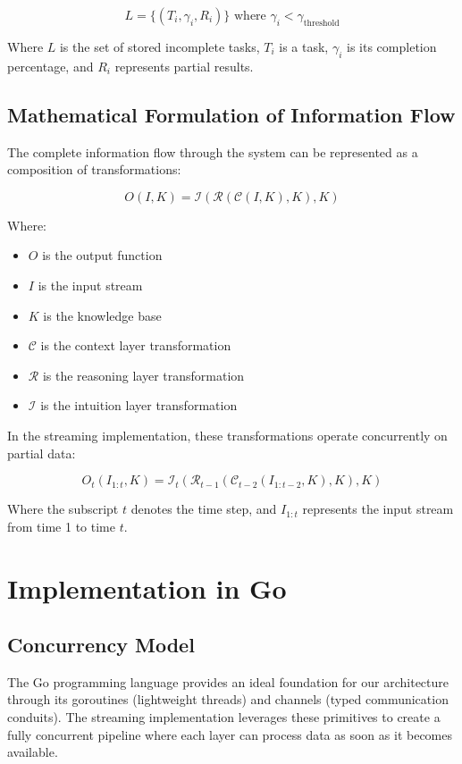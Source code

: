 \documentclass[11pt,a4paper,twocolumn]{article}
\begin{document}
\begin{equation}
L = \{(T_i, \gamma_i, R_i)\} \text{ where } \gamma_i < \gamma_{\text{threshold}}
\end{equation}

Where $L$ is the set of stored incomplete tasks, $T_i$ is a task, $\gamma_i$ is its completion percentage, and $R_i$ represents partial results.

\subsection{Mathematical Formulation of Information Flow}

The complete information flow through the system can be represented as a composition of transformations:

\begin{equation}
O(I, K) = \mathcal{I}(\mathcal{R}(\mathcal{C}(I, K), K), K)
\end{equation}

Where:
\begin{itemize}
    \item $O$ is the output function
    \item $I$ is the input stream
    \item $K$ is the knowledge base
    \item $\mathcal{C}$ is the context layer transformation
    \item $\mathcal{R}$ is the reasoning layer transformation
    \item $\mathcal{I}$ is the intuition layer transformation
\end{itemize}

In the streaming implementation, these transformations operate concurrently on partial data:

\begin{equation}
O_t(I_{1:t}, K) = \mathcal{I}_t(\mathcal{R}_{t-1}(\mathcal{C}_{t-2}(I_{1:t-2}, K), K), K)
\end{equation}

Where the subscript $t$ denotes the time step, and $I_{1:t}$ represents the input stream from time 1 to time $t$.

\section{Implementation in Go}

\subsection{Concurrency Model}
The Go programming language provides an ideal foundation for our architecture through its goroutines (lightweight threads) and channels (typed communication conduits). The streaming implementation leverages these primitives to create a fully concurrent pipeline where each layer can process data as soon as it becomes available.
\end{document}
